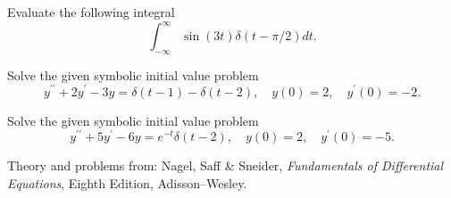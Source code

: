 \documentclass[11pt]{article}
\begin{document}

\begin{problem}
Evaluate the following integral
\begin{equation*}
\int_{-\infty}^{\infty} \sin(3t)\delta(t-\pi/2) d t.
\end{equation*}
\end{problem}





\begin{problem}
Solve the given symbolic initial value problem
\begin{equation*}
y^{\prime \prime} + 2 y^{\prime} - 3 y = \delta(t-1) - \delta(t-2) , \quad y(0) =2 , \quad y^{\prime}(0) = -2.
\end{equation*}
\end{problem}


\begin{problem}
Solve the given symbolic initial value problem
\begin{equation*}
y^{\prime \prime} + 5 y^{\prime} - 6 y = e^{-t}\delta(t-2), \quad y(0) =2 , \quad y^{\prime}(0) = -5.
\end{equation*}
\end{problem}









\LabSolutions


Theory and problems from: Nagel, Saff \& Sneider, \textit{Fundamentals of Differential Equations}, Eighth Edition, Adisson--Wesley.
\end{document}
